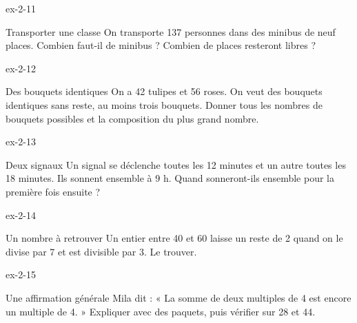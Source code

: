 \begin{blocLivre}{ex-2-11}\begin{exercice}[3]{Transporter une classe}
On transporte 137 personnes dans des minibus de neuf places. Combien faut-il de minibus ? Combien de places resteront libres ?
\end{exercice}\end{blocLivre}
\begin{blocLivre}{ex-2-12}\begin{exercice}[3]{Des bouquets identiques}
On a 42 tulipes et 56 roses. On veut des bouquets identiques sans reste, au moins trois bouquets. Donner tous les nombres de bouquets possibles et la composition du plus grand nombre.
\end{exercice}\end{blocLivre}
\begin{blocLivre}{ex-2-13}\begin{exercice}[3]{Deux signaux}
Un signal se déclenche toutes les 12 minutes et un autre toutes les 18 minutes. Ils sonnent ensemble à 9 h. Quand sonneront-ils ensemble pour la première fois ensuite ?
\end{exercice}\end{blocLivre}
\begin{blocLivre}{ex-2-14}\begin{exercice}[3]{Un nombre à retrouver}
Un entier entre 40 et 60 laisse un reste de 2 quand on le divise par 7 et est divisible par 3. Le trouver.
\end{exercice}\end{blocLivre}
\begin{blocLivre}{ex-2-15}\begin{exercice}[3]{Une affirmation générale}
Mila dit : « La somme de deux multiples de 4 est encore un multiple de 4. » Expliquer avec des paquets, puis vérifier sur 28 et 44.
\end{exercice}\end{blocLivre}

\clearpage
